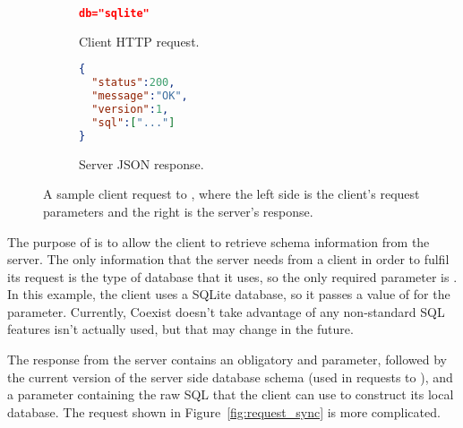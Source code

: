 \begin{figure}[h!]
\begin{subfigure}[b]{0.23\textwidth}
\begin{lstlisting}[language=json]
db="sqlite"
\end{lstlisting}
\caption{Client HTTP request.}
\label{fig:gull}
\end{subfigure}%
\begin{subfigure}[b]{0.27\textwidth}
\begin{lstlisting}[language=json]
{
  "status":200,
  "message":"OK",
  "version":1,
  "sql":["..."]
}
\end{lstlisting}
\caption{Server JSON response.}
\label{fig:tiger}
\end{subfigure}
\caption{A sample client request to \schema, where the left side is the client's
request parameters and the right is the server's response.}
\label{fig:request_schema} \end{figure}

The purpose of \schema is to allow the client to retrieve schema information
from the server. The only information that the server needs from a client in
order to fulfil its request is the type of database that it uses, so the only
required parameter is . In this example, the client uses a SQLite
database, so it passes a value of  for the  parameter.
Currently, Coexist doesn't take advantage of any non-standard SQL features
 isn't actually used, but that may change in the future. 

The response from the server contains an obligatory  and
 parameter, followed by the current version of the server side
database schema (used in requests to \sync), and a  parameter
containing the raw SQL that the client can use to construct its local database.
The \sync request shown in Figure~\ref{fig:request_sync} is more complicated.


